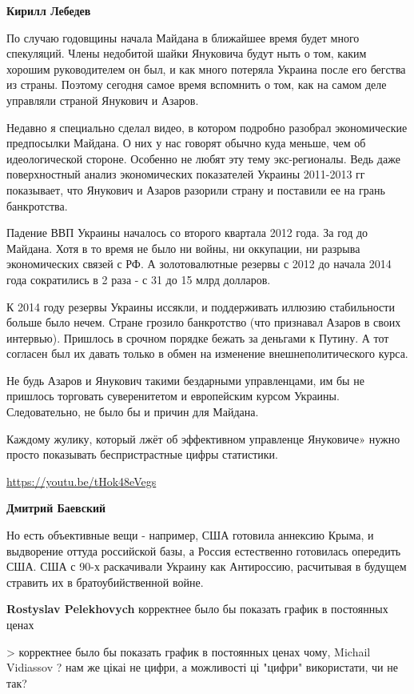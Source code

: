 \begin{itemize}
\begin{itemize}
\textbf{Кирилл Лебедев} 

По случаю годовщины начала Майдана в ближайшее время будет много спекуляций.
Члены недобитой шайки Януковича будут ныть о том, каким хорошим руководителем
он был, и как много потеряла Украина после его бегства из страны. Поэтому
сегодня самое время вспомнить о том, как на самом деле управляли страной
Янукович и Азаров.

Недавно я специально сделал видео, в котором подробно разобрал экономические
предпосылки Майдана. О них у нас говорят обычно куда меньше, чем об
идеологической стороне. Особенно не любят эту тему экс-регионалы. Ведь даже
поверхностный анализ экономических показателей Украины 2011-2013 гг показывает,
что Янукович и Азаров разорили страну и поставили ее на грань банкротства.

Падение ВВП Украины началось со второго квартала 2012 года. За год до Майдана.
Хотя в то время не было ни войны, ни оккупации, ни разрыва экономических связей
с РФ. А золотовалютные резервы с 2012 до начала 2014 года сократились в 2 раза
- с 31 до 15 млрд долларов.

К 2014 году резервы Украины иссякли, и поддерживать иллюзию стабильности больше
было нечем. Стране грозило банкротство (что признавал Азаров в своих интервью).
Пришлось в срочном порядке бежать за деньгами к Путину. А тот согласен был их
давать только в обмен на изменение внешнеполитического курса.

Не будь Азаров и Янукович такими бездарными управленцами, им бы не пришлось
торговать суверенитетом и европейским курсом Украины. Следовательно, не было бы
и причин для Майдана.

Каждому жулику, который лжёт об эффективном управленце Януковиче» нужно просто
показывать беспристрастные цифры статистики.

\url{https://youtu.be/tHok48eVegs}

\textbf{Дмитрий Баевский} 

Но есть объективные вещи - например, США готовила аннексию Крыма, и выдворение
оттуда российской базы, а Россия естественно готовилась опередить США. США с
90-х раскачивали Украину как Антироссию, расчитывая в будущем стравить их в
братоубийственной войне.

\textbf{Rostyslav Pelekhovych} корректнее было бы показать график в постоянных ценах

> корректнее было бы показать график в постоянных ценах
чому, Michail Vidiassov ? нам же цікаі не цифри, а можливості ці "цифри" використати, чи не так?


\end{itemize}
\end{itemize}
